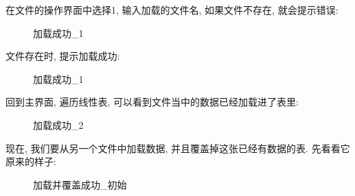 \documentclass[supercite]{Experimental_Report}
\theoremstyle{definition}
\begin{document}
\noindent
在文件的操作界面中选择1, 输入加载的文件名, 如果文件不存在, 就会提示错误:
\begin{figure}[htbp]
	\centering
	\centering
	\caption{加载成功\_1}
	\label{fig3-6}
\end{figure}

\clearpage
\noindent
文件存在时, 提示加载成功:
\begin{figure}[htbp]
	\centering
	\centering
	\caption{加载成功\_1}
	\label{fig3-7}
\end{figure}

\noindent
回到主界面, 遍历线性表, 可以看到文件当中的数据已经加载进了表里:
\begin{figure}[htbp]
	\centering
	\centering
	\caption{加载成功\_2}
	\label{fig3-8}
\end{figure}

\noindent
现在, 我们要从另一个文件中加载数据, 并且覆盖掉这张已经有数据的表. 先看看它原来的样子:
\begin{figure}[htbp]
	\centering
	\centering
	\caption{加载并覆盖成功\_初始}
	\label{fig3-9}
\end{figure}
\end{document}
